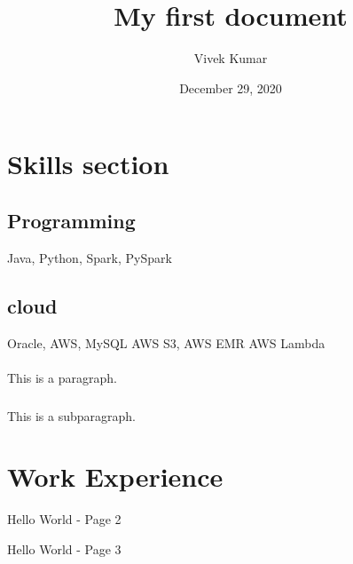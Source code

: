 \documentclass{article}
\title{My first document}
\date{December 29, 2020}
\author{Vivek Kumar}
\begin{document}
	
	\maketitle
	
	\section{Skills section}
	
	\subsection{Programming}
	Java, Python, Spark, PySpark
	
	\subsection{cloud}
	Oracle, AWS, MySQL
	AWS S3,
	AWS EMR
	AWS Lambda

	\paragraph{}
	This is a paragraph.

	\subparagraph{}
	This is a subparagraph.

	\section{Work Experience}

	\newpage

	Hello World - Page 2


	\newpage

	Hello World - Page 3

	
\end{document}
